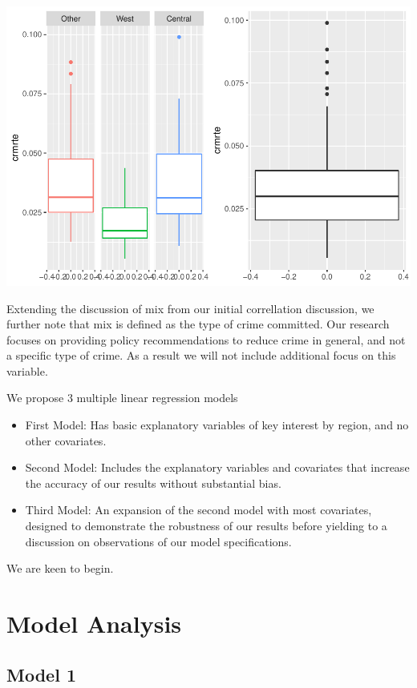 \documentclass[]{article}
\begin{document}
\includegraphics{Bagnard_Gaustad_Hartman_Leung_Lab_3_files/figure-latex/unnamed-chunk-44-1.pdf}

Extending the discussion of mix from our initial correllation
discussion, we further note that mix is defined as the type of crime
committed. Our research focuses on providing policy recommendations to
reduce crime in general, and not a specific type of crime. As a result
we will not include additional focus on this variable.

We propose 3 multiple linear regression models

\begin{itemize}
\item
  First Model: Has basic explanatory variables of key interest by
  region, and no other covariates.
\item
  Second Model: Includes the explanatory variables and covariates that
  increase the accuracy of our results without substantial bias.
\item
  Third Model: An expansion of the second model with most covariates,
  designed to demonstrate the robustness of our results before yielding
  to a discussion on observations of our model specifications.
\end{itemize}

We are keen to begin.

\hypertarget{model-analysis}{%
\section{Model Analysis}\label{model-analysis}}

\hypertarget{model-1}{%
\subsection{Model 1}\label{model-1}}
\end{document}
